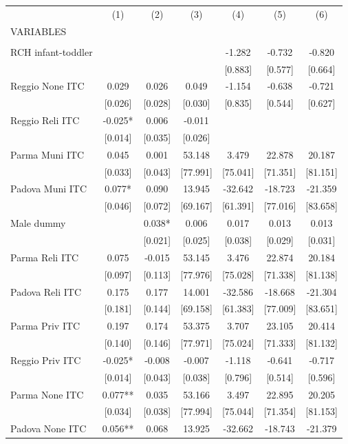 \begin{tabular}{lcccccc} \hline
 & (1) & (2) & (3) & (4) & (5) & (6) \\
VARIABLES &  &  &  &  &  &  \\ \hline
 &  &  &  &  &  &  \\
RCH infant-toddler &  &  &  & -1.282 & -0.732 & -0.820 \\
 &  &  &  & [0.883] & [0.577] & [0.664] \\
Reggio None ITC & 0.029 & 0.026 & 0.049 & -1.154 & -0.638 & -0.721 \\
 & [0.026] & [0.028] & [0.030] & [0.835] & [0.544] & [0.627] \\
Reggio Reli ITC & -0.025* & 0.006 & -0.011 &  &  &  \\
 & [0.014] & [0.035] & [0.026] &  &  &  \\
Parma Muni ITC & 0.045 & 0.001 & 53.148 & 3.479 & 22.878 & 20.187 \\
 & [0.033] & [0.043] & [77.991] & [75.041] & [71.351] & [81.151] \\
Padova Muni ITC & 0.077* & 0.090 & 13.945 & -32.642 & -18.723 & -21.359 \\
 & [0.046] & [0.072] & [69.167] & [61.391] & [77.016] & [83.658] \\
Male dummy &  & 0.038* & 0.006 & 0.017 & 0.013 & 0.013 \\
 &  & [0.021] & [0.025] & [0.038] & [0.029] & [0.031] \\
Parma Reli ITC & 0.075 & -0.015 & 53.145 & 3.476 & 22.874 & 20.184 \\
 & [0.097] & [0.113] & [77.976] & [75.028] & [71.338] & [81.138] \\
Padova Reli ITC & 0.175 & 0.177 & 14.001 & -32.586 & -18.668 & -21.304 \\
 & [0.181] & [0.144] & [69.158] & [61.383] & [77.009] & [83.651] \\
Parma Priv ITC & 0.197 & 0.174 & 53.375 & 3.707 & 23.105 & 20.414 \\
 & [0.140] & [0.146] & [77.971] & [75.024] & [71.333] & [81.132] \\
Reggio Priv ITC & -0.025* & -0.008 & -0.007 & -1.118 & -0.641 & -0.717 \\
 & [0.014] & [0.043] & [0.038] & [0.796] & [0.514] & [0.596] \\
Parma None ITC & 0.077** & 0.035 & 53.166 & 3.497 & 22.895 & 20.205 \\
 & [0.034] & [0.038] & [77.994] & [75.044] & [71.354] & [81.153] \\
Padova None ITC & 0.056** & 0.068 & 13.925 & -32.662 & -18.743 & -21.379 \\

\end{tabular}

